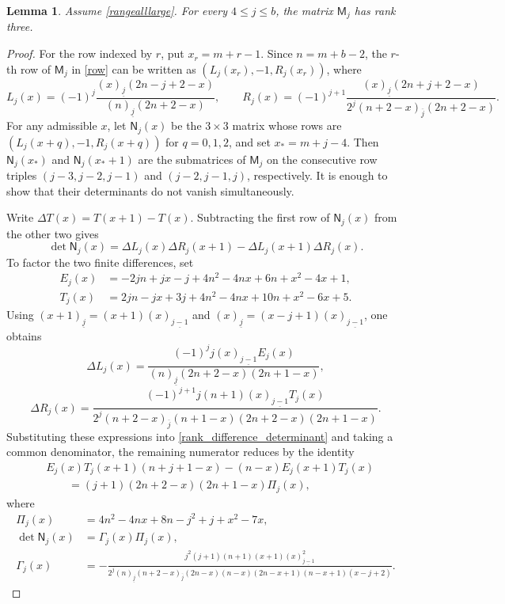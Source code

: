 \documentclass[10pt,a4paper]{amsart}
\newtheorem{lemma}{Lemma}[section]
\newcommand{\fall}[2]{(#1)_{\underline{#2}}}
\newcommand{\rise}[2]{(#1)_{\overline{#2}}}
\begin{document}
\begin{lemma}\label{rank}
Assume \eqref{rangealllarge}.  For every $4\le j\le b$, the matrix
$\mathsf M_j$ has rank three.
\end{lemma}
\begin{proof}
For the row indexed by $r$, put $x_r=m+r-1$.  Since $n=m+b-2$, the
$r$-th row of $\mathsf M_j$ in \eqref{row} can be written as
$(L_j(x_r),-1,R_j(x_r))$, where
\[
 L_j(x)=(-1)^j\frac{\fall{x}{j}(2n-j+2-x)}
 {\fall{n}{j}(2n+2-x)},\qquad
 R_j(x)=(-1)^{j+1}\frac{\fall{x}{j}(2n+j+2-x)}
 {2^j\rise{n+2-x}{j}(2n+2-x)}.
\]
For any admissible $x$, let $\mathsf N_j(x)$ be the $3\times3$ matrix
whose rows are $(L_j(x+q),-1,R_j(x+q))$ for $q=0,1,2$, and set
$x_*=m+j-4$.  Then $\mathsf N_j(x_*)$ and $\mathsf N_j(x_*+1)$ are the submatrices of $\mathsf M_j$ on the
consecutive row triples $(j-3,j-2,j-1)$ and $(j-2,j-1,j)$,
respectively.  It is enough to show that their determinants do not
vanish simultaneously.

Write $\Delta T(x)=T(x+1)-T(x)$.  Subtracting the first row of
$\mathsf N_j(x)$ from the other two gives
\begin{equation}\label{rank_difference_determinant}
 \det \mathsf N_j(x)=
 \Delta L_j(x)\Delta R_j(x+1)
 -\Delta L_j(x+1)\Delta R_j(x).
\end{equation}
To factor the two finite differences, set
\[
\begin{aligned}
 E_j(x)&=-2jn+jx-j+4n^2-4nx+6n+x^2-4x+1,\\
 T_j(x)&= 2jn-jx+3j+4n^2-4nx+10n+x^2-6x+5.
\end{aligned}
\]
Using
$\fall{x+1}{j}=(x+1)\fall{x}{j-1}$ and
$\fall{x}{j}=(x-j+1)\fall{x}{j-1}$, one obtains
\[
 \Delta L_j(x)=
 \frac{(-1)^j j\fall{x}{j-1}E_j(x)}
 {\fall{n}{j}(2n+2-x)(2n+1-x)},
\]
\[
 \Delta R_j(x)=
 \frac{(-1)^{j+1}j(n+1)\fall{x}{j-1}T_j(x)}
 {2^j\rise{n+2-x}{j}(n+1-x)(2n+2-x)(2n+1-x)}.
\]
Substituting these expressions into
\eqref{rank_difference_determinant} and taking a common denominator,
the remaining numerator reduces by the identity
\[
\begin{split}
&E_j(x)T_j(x+1)(n+j+1-x)
 -(n-x)E_j(x+1)T_j(x)\\
&\qquad=(j+1)(2n+2-x)(2n+1-x)\Pi_j(x),
\end{split}
\]
where
\begin{equation}\label{detfactor}
\begin{aligned}
 \Pi_j(x)&=4n^2-4nx+8n-j^2+j+x^2-7x,\\
 \det \mathsf N_j(x)&=\Gamma_j(x)\Pi_j(x),\\
 \Gamma_j(x)&=
 -\frac{j^2(j+1)(n+1)(x+1)\fall{x}{j-1}^{2}}
 {2^j\fall{n}{j}\rise{n+2-x}{j}
 (2n-x)(n-x)(2n-x+1)(n-x+1)(x-j+2)}.
\end{aligned}
\end{equation}


\end{proof}
\end{document}
